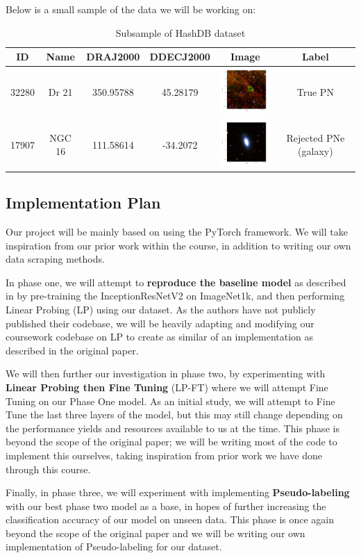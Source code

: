 \documentclass{article}
\begin{document}
Below is a small sample of the data we will be working on:
\begin{table}[h!]
\centering
\begin{tabular}{|c|c|c|c|c|c|}
\hline
\textbf{ID} & \textbf{Name} & \textbf{DRAJ2000} & \textbf{DDECJ2000} & \textbf{Image} & \textbf{Label} \\ \hline
32280 & Dr 21 & 350.95788 & 45.28179 & \includegraphics[width=1in]{32280_wise432_rgb.png} & True PN \\ \hline
17907 & NGC 16 & 111.58614 & -34.2072 & \includegraphics[width=1in]{17907_sss_irb2.png} & Rejected PNe (galaxy) \\ \hline
\end{tabular}
\caption{Subsample of HashDB dataset}

\end{table}


\subsection{Implementation Plan}
Our project will be mainly based on using the PyTorch framework. We will take inspiration from our prior work within the course, in addition to writing our own data scraping methods.

In phase one, we will attempt to \textbf{reproduce the baseline model} as described in \citet{awangiskandar2020} by pre-training the InceptionResNetV2 on ImageNet1k, and then performing Linear Probing (LP) using our dataset. As the authors have not publicly published their codebase, we will be heavily adapting and modifying our coursework codebase on LP to create as similar of an implementation as described in the original paper.

We will then further our investigation in phase two, by experimenting with \textbf{Linear Probing then Fine Tuning} (LP-FT) where we will attempt Fine Tuning on our Phase One model. As an initial study, we will attempt to Fine Tune the last three layers of the model, but this may still change depending on the performance yields and resources available to us at the time. This phase is beyond the scope of the original paper; we will be writing most of the code to implement this ourselves, taking inspiration from prior work we have done through this course.

Finally, in phase three, we will experiment with implementing \textbf{Pseudo-labeling} with our best phase two model as a base, in hopes of further increasing the classification accuracy of our model on unseen data. This phase is once again beyond the scope of the original paper and we will be writing our own implementation of Pseudo-labeling for our dataset.
\newpage


\end{document}
